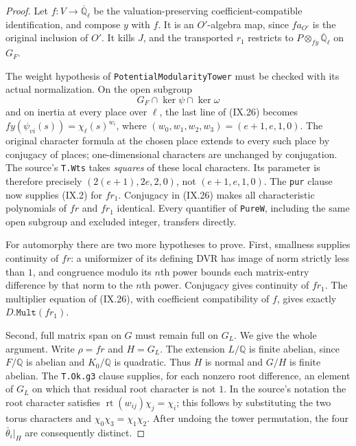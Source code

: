 \begin{proof}
Let $f:V\to\overline{\mathbb Q}_\ell$ be the
valuation-preserving coefficient-compatible
identification, and compose $y$ with $f$.
It is an $O'$-algebra map, since
$f a_{O'}$ is the original inclusion of $O'$.
It kills $J$, and the transported $r_1$ restricts
to $P\otimes_{fy}\overline{\mathbb Q}_\ell$ on $G_F$.

The weight hypothesis of \texttt{PotentialModularityTower}
must be checked with its actual normalization.  On the
open subgroup
\[
             G_F\cap\ker\psi\cap\ker\omega
 \tag{IX.36}
\]
and on inertia at every place over $\ell$, the last
line of (IX.26) becomes
$f y(\psi_{vi}(s))=\chi_\ell(s)^{w_i}$,
where $(w_0,w_1,w_2,w_3)=(e+1,e,1,0)$.
The original character formula at the chosen place
extends to every such place by conjugacy of places;
one-dimensional characters are unchanged by
conjugation.  The source's \texttt{T.Wts} takes
\emph{squares} of these local characters.
Its parameter is therefore precisely
$(2(e+1),2e,2,0)$, not $(e+1,e,1,0)$.
The \texttt{pur} clause now supplies (IX.2) for
$f r_1$.  Conjugacy in (IX.26) makes all characteristic
polynomials of $fr$ and $fr_1$ identical.  Every
quantifier of \texttt{PureW}, including the same
open subgroup and excluded integer, transfers directly.

For automorphy there are two more hypotheses to prove.
First, smallness supplies continuity of $fr$: a
uniformizer of its defining DVR has image of norm
strictly less than $1$, and congruence modulo its
$n$th power bounds each matrix-entry difference by
that norm to the $n$th power.  Conjugacy gives
continuity of $fr_1$.  The multiplier equation of
(IX.26), with coefficient compatibility of $f$,
gives exactly $D.\texttt{Mult}(fr_1)$.

Second, full matrix span on $G$ must remain full
on $G_L$.  We give the whole argument.
Write $\rho=fr$ and $H=G_L$.  The extension $L/\mathbb Q$
is finite abelian, since $F/\mathbb Q$ is abelian and
$K_0/\mathbb Q$ is quadratic.  Thus $H$ is normal and
$G/H$ is finite abelian.
The \texttt{T.Ok.g3} clause supplies, for each
nonzero root difference, an element of $G_L$ on
which that residual root character is not $1$.
In the source's notation the root character satisfies
$\operatorname{rt}(w_{ij})\chi_j=\chi_i$;
this follows by substituting the two torus characters
and $\chi_0\chi_3=\chi_1\chi_2$.
After undoing the tower permutation, the four
$\bar\theta_i|_H$ are consequently distinct.


\end{proof}
